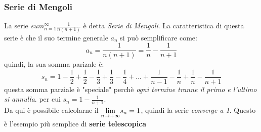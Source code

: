 \documentclass[12pt, a4paper, openany]{book}
\begin{document}
\subsubsection*{Serie di Mengoli}
La serie $sum_{n=1}^\infty \frac{1}{n(n+1)}$ è detta \emph{Serie di Mengoli}.
La caratteristica di questa serie è che il suo termine generale $a_n$ si può semplificare come:
\begin{equation*}
    a_n = \frac{1}{n(n+1)} = \frac{1}{n} - \frac{1}{n+1}
\end{equation*}
quindi, la sua somma parizale è:
\begin{equation*}
    s_n = 1 - \frac{1}{2} + \frac{1}{2} - \frac{1}{3} +  \frac{1}{3} - \frac{1}{4} + ... +  \frac{1}{n-1} - \frac{1}{n} +  \frac{1}{n} - \frac{1}{n+1}
\end{equation*}
questa somma parziale è "speciale" perchè \emph{ogni termine tranne il primo e l'ultimo si annulla}. per cui $s_n = 1 - \frac{1}{n+1}$.
\\Da qui è possibile calcolarne il $\underset{n \to +\infty}{\lim} s_n = 1$, quindi la serie \emph{converge a 1}.
Questo è l'esempio più semplice di \textbf{serie telescopica}  
\end{document}
